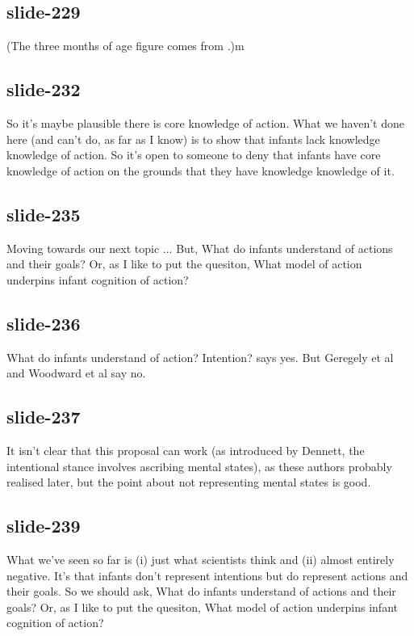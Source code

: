 \documentclass[12pt,\papersize]{extarticle}
\begin{document}
 
\subsection{slide-229}
(The three months of age figure comes from \citet{Sommerville:2005te}.)m
 
 
\subsection{slide-232}
So it's maybe plausible there is core knowledge of action.
What we haven't done here (and can't do, as far as I know) is to show that infants lack knowledge knowledge of action.
So it's open to someone to deny that infants have core knowledge of action on the grounds that they have knowledge knowledge of it.
 
 
\subsection{slide-235}
Moving towards our next topic ...
But, What do infants understand of actions and their goals?
Or, as I like to put the quesiton, What model of action underpins infant cognition of action?
 
 
\subsection{slide-236}
What do infants understand of action? Intention?
\citet{Premack:1990jl} says yes.
But Geregely et al and Woodward et al say no.
 
 
\subsection{slide-237}
It isn't clear that this proposal can work (as introduced by Dennett, the intentional stance involves ascribing mental states), as these authors probably realised later, but the point about not representing mental states is good.
 
 
\subsection{slide-239}
What we've seen so far is (i) just what scientists think and (ii) almost entirely negative.
It's that infants don't represent intentions but do represent actions and their goals.
So we should ask, What do infants understand of actions and their goals?
Or, as I like to put the quesiton, What model of action underpins infant cognition of action?


 






\end{document}
